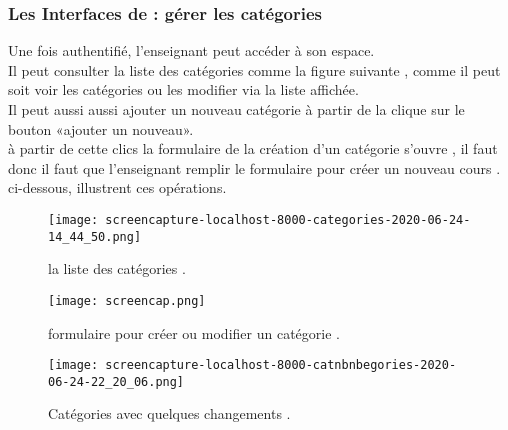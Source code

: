 \subsubsection{Les Interfaces de : gérer les catégories  }
Une fois authentifié,  l'enseignant peut accéder à son espace. \\ 
Il peut consulter la liste  des catégories comme la figure suivante
, comme il peut soit voir les catégories ou les modifier
via la liste affichée.  \\
Il peut aussi aussi ajouter un nouveau catégorie à partir de  la clique sur le bouton «ajouter un nouveau».  \\
à partir de cette clics la formulaire de la création d'un catégorie s'ouvre , il faut donc il faut que l'enseignant remplir le formulaire  pour créer un nouveau cours . \\
ci-dessous, illustrent ces opérations.
\medskip
\medskip
\medskip
\begin{figure}[ht]
	\centering
	\texttt{[image: screencapture-localhost-8000-categories-2020-06-24-14\_44\_50.png]}
	\caption{la liste des catégories .}
	\label{fig:la liste des catégories }
\end{figure}
\FloatBarrier


\begin{figure}[ht]
	\centering
	\texttt{[image: screencap.png]}
	\caption{formulaire pour créer ou modifier un catégorie .}
	\label{fig: formulaire pour créer ou modifier un catégorie }
\end{figure}
\FloatBarrier

\begin{figure}[ht]
	\centering
	\texttt{[image: screencapture-localhost-8000-catnbnbegories-2020-06-24-22\_20\_06.png]}
	\caption{Catégories avec quelques changements .}
	\label{fig: Catégories avec quelques changements  }
\end{figure}
\FloatBarrier



\clearpage


